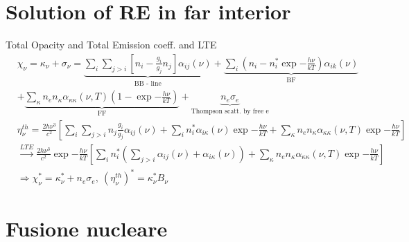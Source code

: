\section{Solution of RE in far interior}


\begin{frame}{Total Opacity and Total Emission coeff. and LTE}
    \begin{align*}
        &\chi_{\nu}=\kappa_{\nu}+\sigma_{\nu}=\underbrace{\sum_i\sum_{j>i}[n_i-\frac{g_i}{g_j}n_j]\alpha_{ij}(\nu)}_{\text{BB - line}}+\underbrace{\sum_i(n_i-n_i^*\exp{-\frac{h\nu}{kT}})\alpha_{ik}(\nu)}_{\text{BF}}\\
        &+\underbrace{\sum_{\kappa}n_en_{\kappa}\alpha_{\kappa\kappa}(\nu,T)(1-\exp{-\frac{h\nu}{kT}})}_{\text{FF}}+\underbrace{n_e\sigma_e}_{\text{Thompson scatt. by free e}}\tag{Tot.Opa.}\\
        &\eta_{\nu}^{th}=\frac{2h\nu^3}{c^2}[\sum_i\sum_{j>i}n_j \frac{g_i}{g_j}\alpha_{ij}(\nu)+\sum_in_i^*\alpha_{i\kappa}(\nu)\exp{-\frac{h\nu}{kT}}+\sum_{\kappa}n_en_{\kappa}\alpha_{\kappa\kappa}(\nu,T)\exp{-\frac{h\nu}{kT}}]\\
        &\xrightarrow{LTE}\frac{2h\nu^3}{c^2}\exp{-\frac{h\nu}{kT}}[\sum_in_i^* (\sum_{j>i}\alpha_{ij}(\nu)+\alpha_{i\kappa}(\nu))+\sum_{\kappa}n_en_{\kappa}\alpha_{\kappa\kappa}(\nu,T)\exp{-\frac{h\nu}{kT}}]\\
        &\Rightarrow\chi_{\nu}^*=\kappa_{\nu}^*+n_e\sigma_e,\ (\eta_{\nu}^{th})^*=\kappa_{\nu}^*B_{\nu}
    \end{align*}
\end{frame}


\section{Fusione nucleare}

